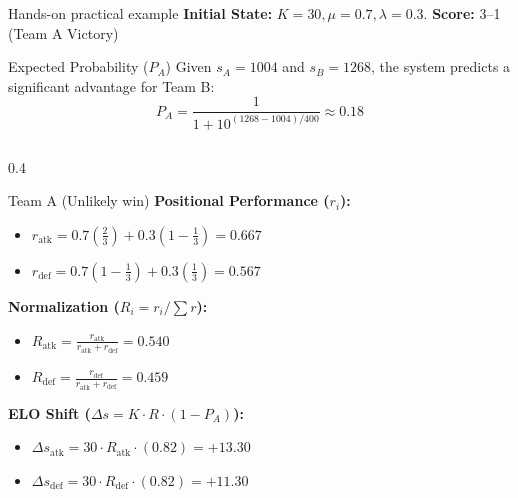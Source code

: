\documentclass[10pt, aspectratio=169]{beamer}
\begin{document}
\begin{frame}{Hands-on practical example}
\fontsize{7pt}{9pt}\selectfont
\textbf{Initial State:} $K=30, \mu=0.7, \lambda=0.3$. \hfill \textbf{Score:} 3--1 (Team A Victory)
    
    \vspace{0.1em}
    \begin{block}{Expected Probability ($P_A$)}
        Given $s_A = 1004$ and $s_B = 1268$, the system predicts a significant advantage for Team B:
        $$ P_A = \frac{1}{1 + 10^{(1268-1004)/400}} \approx \mathbf{0.18}$$
    \end{block}

	\vspace{-2em}
    \begin{columns}[T]
        \begin{column}{0.4\textwidth}
            \begin{alertblock}{Team A (Unlikely win)}
                \tiny
                \textbf{Positional Performance ($r_i$):}
                \begin{itemize}
                    \item $r_{\text{atk}} = 0.7(\frac{2}{3}) + 0.3(1 - \frac{1}{3}) = 0.667$
                    \item $r_{\text{def}} = 0.7(1 - \frac{1}{3}) + 0.3(\frac{1}{3}) = 0.567$
                \end{itemize}
                
                \textbf{Normalization ($R_i = r_i / \sum r$):}
                \begin{itemize}
                    \item $R_{\text{atk}} = \frac{r_{\text{atk}}}{r_{\text{atk}} + r_{\text{def}}} = 0.540$
                    \item $R_{\text{def}} = \frac{r_{\text{def}}}{r_{\text{atk}} + r_{\text{def}}} = 0.459$
                \end{itemize}
                
                \textbf{ELO Shift ($\Delta s = K \cdot R \cdot (1 - P_A)$):}
                \begin{itemize}
                    \item $\Delta s_{\text{atk}} = 30 \cdot R_{\text{atk}} \cdot (0.82) = \mathbf{+13.30}$
                    \item $\Delta s_{\text{def}} = 30 \cdot R_{\text{def}} \cdot (0.82) = \mathbf{+11.30}$
                \end{itemize}
            \end{alertblock}
        \end{column}


\end{columns}
\end{frame}
\end{document}

